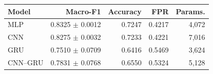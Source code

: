 \begin{tabular}{lrrrr}
\toprule
Model & Macro-F1 & Accuracy & FPR & Params. \\
\midrule
MLP & 0.8325 $\pm$ 0.0012 & 0.7247 & 0.4217 & 4,072 \\
CNN & 0.8275 $\pm$ 0.0032 & 0.7233 & 0.4221 & 7,016 \\
GRU & 0.7510 $\pm$ 0.0709 & 0.6416 & 0.5469 & 3,624 \\
CNN--GRU & 0.7831 $\pm$ 0.0768 & 0.6550 & 0.5324 & 5,128 \\
\bottomrule
\end{tabular}
